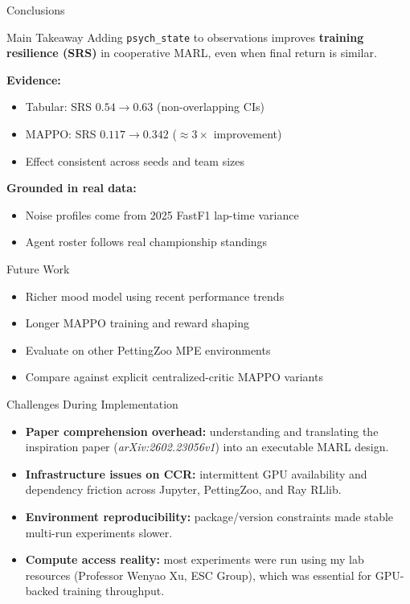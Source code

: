 \documentclass[10pt,aspectratio=169]{beamer}
\newcommand{\psych}{\texttt{psych\_state}}
\begin{document}
\begin{frame}{Conclusions}
  \small
  \begin{block}{Main Takeaway}
    Adding \psych{} to observations improves \textbf{training resilience (SRS)}
    in cooperative MARL, even when final return is similar.
  \end{block}

  \smallskip
  \textbf{Evidence:}
  \begin{itemize}
    \item Tabular: SRS $0.54 \to 0.63$ (non-overlapping CIs)
    \item MAPPO:  SRS $0.117 \to 0.342$ \;($\approx3\times$ improvement)
    \item Effect consistent across seeds and team sizes
  \end{itemize}

  \smallskip
  \textbf{Grounded in real data:}
  \begin{itemize}
    \item Noise profiles come from 2025 FastF1 lap-time variance
    \item Agent roster follows real championship standings
  \end{itemize}

\end{frame}

\begin{frame}{Future Work}
  \small
  \begin{itemize}
    \item Richer mood model using recent performance trends
    \item Longer MAPPO training and reward shaping
    \item Evaluate on other PettingZoo MPE environments
    \item Compare against explicit centralized-critic MAPPO variants
  \end{itemize}
\end{frame}

\begin{frame}{Challenges During Implementation}
  \small
  \begin{itemize}
    \item \textbf{Paper comprehension overhead:}
          understanding and translating the inspiration paper
          (\textit{arXiv:2602.23056v1}) into an executable MARL design.
    \item \textbf{Infrastructure issues on CCR:}
          intermittent GPU availability and dependency friction across
          Jupyter, PettingZoo, and Ray RLlib.
    \item \textbf{Environment reproducibility:}
          package/version constraints made stable multi-run experiments slower.
    \item \textbf{Compute access reality:}
          most experiments were run using my lab resources
          (Professor Wenyao Xu, ESC Group), which was essential for
          GPU-backed training throughput.
  \end{itemize}
\end{frame}
\end{document}
